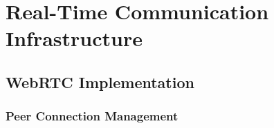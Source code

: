 \documentclass[11pt,a4paper,twoside]{report}
\begin{document}
\newpage

\section{Real-Time Communication Infrastructure}
\label{sec:communication}

\subsection{WebRTC Implementation}
\label{subsec:webrtc-implementation}

\subsubsection{Peer Connection Management}
\label{subsubsec:peer-connection}
\end{document}
